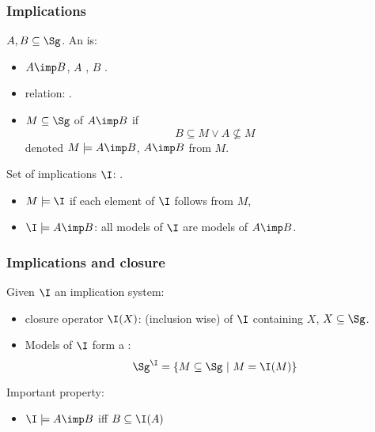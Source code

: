 \begin{frame}
\frametitle{Implications}

$A, B \subseteq \Sg$. An  is:
\begin{itemize}
	\item $A \imp B$, $A$ , $B$ .
	\item {} relation: .
	\item $M \subseteq \Sg$  of $A \imp B$ if
		 \[B \subseteq M \lor A \nsubseteq M \]
	denoted $M \models A \imp B$, $A \imp B$  from $M$.
\end{itemize}

\vspace{0.5em}

Set of implications $\I$: .
\begin{itemize}
	\item $M \models \I$ if each element of $\I$ follows from $M$,
	\item $\I \models A \imp B$: all models of $\I$ are models of $A \imp B$.
\end{itemize}

\end{frame}


\begin{frame}
\frametitle{Implications and closure}

Given $\I$ an implication system:
\begin{itemize}
	\item closure operator $\I(X)$:  (inclusion wise) of 
	$\I$ containing $X$, $X \subseteq \Sg$. 
	\item Models of $\I$ form a :
		\[ \Sg^{\I} = \{ M \subseteq \Sg \ | \ M = \I(M) \} \]
\end{itemize}

\vspace{1.2em}

\begin{lightreminder}
Important property:
\begin{itemize}
	\item $\I \models A \imp B$ iff $B \subseteq \I(A)$
\end{itemize}
\end{lightreminder}

\end{frame}

